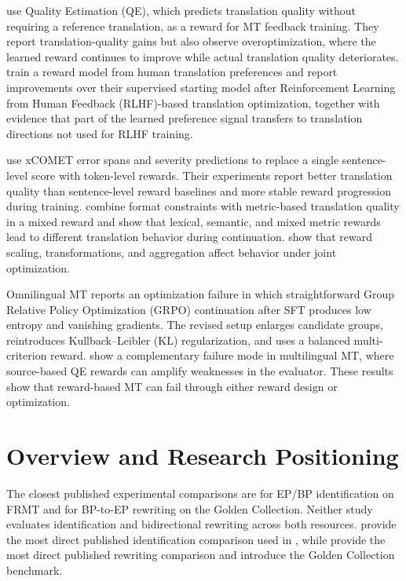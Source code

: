 \citet{he-etal-2024-improving} use Quality Estimation (QE), which predicts
translation quality without requiring a reference translation, as a reward for
MT feedback training. They report translation-quality gains but also observe
overoptimization, where the learned reward continues to improve while actual
translation quality deteriorates. \citet{xu2024advancingtranslationpreference}
train a reward model from human translation preferences and report
improvements over their supervised starting model after Reinforcement Learning
from Human Feedback (RLHF)-based translation optimization, together with
evidence that part of the learned preference signal transfers to translation
directions not used for RLHF training.

\citet{ramos2024finegrainedrewardoptimization} use xCOMET error spans and
severity predictions to replace a single sentence-level score with token-level
rewards. Their experiments report better translation quality than
sentence-level reward baselines and more stable reward progression during
training. \citet{feng2025mtr1zero} combine format constraints with
metric-based translation quality in a mixed reward and show that lexical,
semantic, and mixed metric rewards lead to different translation behavior
during continuation. \citet{pmlr-v235-wang24ay} show that reward scaling,
transformations, and aggregation affect behavior under joint optimization.

Omnilingual MT \citep{omnilingualmtteam2026omnilingualmtmachinetranslation}
reports an optimization failure in which straightforward Group Relative Policy
Optimization (GRPO) continuation after SFT produces low entropy and vanishing
gradients. The revised setup enlarges candidate groups, reintroduces
Kullback--Leibler (KL) regularization, and uses a balanced multi-criterion
reward. \mbox{\citet{liu-etal-2026-mending}} show a complementary failure mode
in multilingual MT, where source-based QE rewards can amplify weaknesses in
the evaluator. These results show that reward-based MT can fail through either
reward design or optimization.

\section{Overview and Research Positioning}
\label{sec:rw-overview}

The closest published experimental comparisons are
\citet{sousa2025enhancingportuguesevarietyidentification} for EP/BP
identification on FRMT and
\citet{sanches2024brazilianportugueseeuropeanportuguese} for BP-to-EP
rewriting on the Golden Collection. Neither study evaluates identification and
bidirectional rewriting across both resources. \citet{sousa2025enhancingportuguesevarietyidentification} provide the most
direct published identification comparison used in ,
while \citet{sanches2024brazilianportugueseeuropeanportuguese} provide the most direct published rewriting comparison
and introduce the Golden Collection benchmark.

